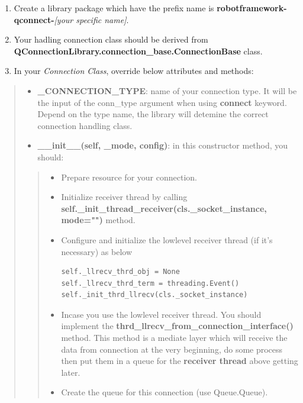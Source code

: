 \begin{enumerate}
\def\labelenumi{\arabic{enumi}.}
\tightlist
\item
  Create a library package which have the prefix name is
  \textbf{robotframework-qconnect-}\emph{{[}your specific name{]}}.
\item
  Your hadling connection class should be derived from
  \textbf{QConnectionLibrary.connection\_base.ConnectionBase} class.
\item
  In your \emph{Connection Class}, override below attributes and
  methods:
\end{enumerate}

\begin{quote}
\begin{itemize}
\tightlist
\item
  \textbf{\_CONNECTION\_TYPE}: name of your connection type. It will be
  the input of the conn\_type argument when using \textbf{connect}
  keyword. Depend on the type name, the library will detemine the
  correct connection handling class.
\item
  \textbf{\_\_init\_\_(self, \_mode, config)}: in this constructor
  method, you should:
\end{itemize}

\begin{quote}
\begin{itemize}
\item
  Prepare resource for your connection.
\item
  Initialize receiver thread by calling
  \textbf{self.\_init\_thread\_receiver(cls.\_socket\_instance,
  mode="")} method.
\item
  Configure and initialize the lowlevel receiver thread (if it's
  necessary) as below

\begin{verbatim}
self._llrecv_thrd_obj = None
self._llrecv_thrd_term = threading.Event()
self._init_thrd_llrecv(cls._socket_instance)
\end{verbatim}
\item
  Incase you use the lowlevel receiver thread. You should implement the
  \textbf{thrd\_llrecv\_from\_connection\_interface()} method. This
  method is a mediate layer which will receive the data from connection
  at the very beginning, do some process then put them in a queue for
  the \textbf{receiver thread} above getting later.
\item
  Create the queue for this connection (use Queue.Queue).
\end{itemize}
\end{quote}


\end{quote}
